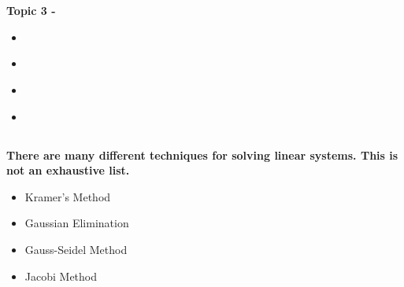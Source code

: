 \documentclass[fleqn]{beamer} %
\newcommand{\sectionIIItitle}{}
\newcommand{\sectionIIsubsectionIVtitle}{}
\newcommand{\sectionIIIsubsectionItitle}{}
\newcommand{\sectionIIIsubsectionIItitle}{}
\newcommand{\sectionIIIsubsectionIIItitle}{}
\newcommand{\sectionIIIsubsectionIVtitle}{}
\begin{document}
			\begin{frame}
				\frametitle{\sectionIIsubsectionIVtitle}
				\bigskip


				\btVFill 
			\end{frame}
		
	\section{\sectionIIItitle}\label{sectionIII}

		\begin{frame}
			\large \textbf{Topic 3 - \sectionIIItitle} \vspace{3mm}\\

			\begin{itemize}
				\item \hyperlink{sectionIIIsubsectionI}{\sectionIIIsubsectionItitle} \vspc %
				\item \hyperlink{sectionIIIsubsectionII}{\sectionIIIsubsectionIItitle} \vspc %
				\item \hyperlink{sectionIIIsubsectionIII}{\sectionIIIsubsectionIIItitle} \vspc %
				\item \hyperlink{sectionIIIsubsectionIV}{\sectionIIIsubsectionIVtitle} \vspc %
			\end{itemize}

		\end{frame}

		\subsection{\sectionIIIsubsectionItitle}\label{sectionIIIsubsectionI}

			\begin{frame}
				\frametitle{\sectionIIIsubsectionItitle}
				\bigskip

				\textbf{There are many different techniques for solving linear systems. This is not an exhaustive list.} \\	
				\begin{itemize}
					\item Kramer's Method
					\item Gaussian Elimination 
					\item Gauss-Seidel Method
					\item Jacobi Method
				\end{itemize}
			  	
				\btVFill
			\end{frame}
\end{document}
